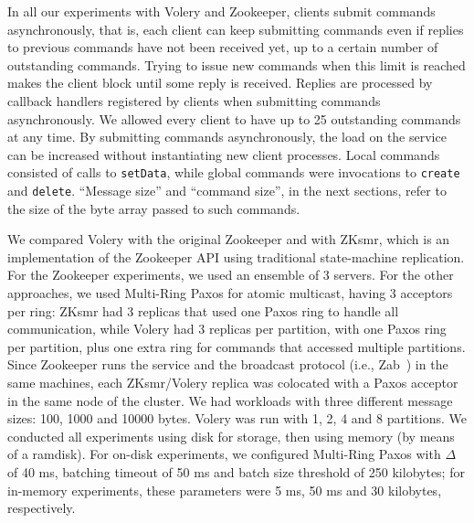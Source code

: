 In all our experiments with Volery and Zookeeper, clients submit commands asynchronously, that is, each client can keep submitting commands even if replies to previous commands have not been received yet, up to a certain number of outstanding commands. 
Trying to issue new commands when this limit is reached makes the client block until some reply is received. 
Replies are processed by callback handlers registered by clients when submitting commands asynchronously. 
We allowed every client to have up to 25 outstanding commands at any time. 
By submitting commands asynchronously, the load on the service can be increased without instantiating new client processes.
Local commands consisted of calls to \verb#setData#, while global commands were invocations to \verb#create# and \verb#delete#. 
``Message size'' and ``command size'', in the next sections, refer to the size of the byte array passed to such commands.



We compared Volery with the original Zookeeper and with ZKsmr, which is an implementation of the Zookeeper API using traditional state-machine replication. 
For the Zookeeper experiments, we used an ensemble of 3 servers. 
For the other approaches, we used Multi-Ring Paxos for atomic multicast, having 3 acceptors per ring: ZKsmr had 3 replicas that used one Paxos ring to handle all communication, while Volery had 3 replicas per partition, with one Paxos ring per partition, plus one extra ring for commands that accessed multiple partitions. 
Since Zookeeper runs the service and the broadcast protocol (i.e., Zab~\cite{ZAB2011}) in the same machines, each ZKsmr/Volery replica was colocated with a Paxos acceptor in the same node of the cluster. 
We had workloads with three different message sizes: 100, 1000 and 10000 bytes. 
Volery was run with 1, 2, 4 and 8 partitions. 
We conducted all experiments using disk for storage, then using memory (by means of a ramdisk). 
For on-disk experiments, we configured Multi-Ring Paxos with $\Delta$ \cite{MRPPROC2012} of 40 ms, batching timeout of 50 ms and batch size threshold of 250 kilobytes; for in-memory experiments, these parameters were 5 ms, 50 ms and 30 kilobytes, respectively.


